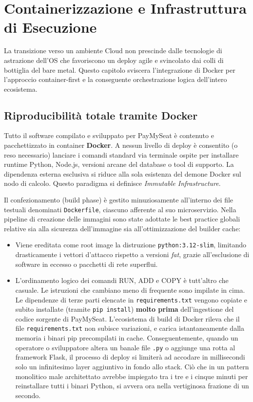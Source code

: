 \documentclass[11pt,a4paper]{report}
\begin{document}
\chapter{Containerizzazione e Infrastruttura di Esecuzione}

La transizione verso un ambiente Cloud non prescinde dalle tecnologie di astrazione dell'OS che favoriscono un deploy agile e svincolato dai colli di bottiglia del bare metal. Questo capitolo sviscera l'integrazione di Docker per l'approccio container-first e la conseguente orchestrazione logica dell'intero ecosistema.

\section{Riproducibilità totale tramite Docker}
Tutto il software compilato e sviluppato per PayMySeat \`e contenuto e pacchettizzato in container \textbf{Docker}. A nessun livello di deploy \`e consentito (o reso necessario) lanciare i comandi standard via terminale ospite per installare runtime Python, Node.js, versioni arcane del database o tool di supporto. La dipendenza esterna esclusiva si riduce alla sola esistenza del demone Docker sul nodo di calcolo. Questo paradigma si definisce \textit{Immutable Infrastructure}.

Il confezionamento (build phase) \`e gestito minuziosamente all'interno dei file testuali denominati \texttt{Dockerfile}, ciascuno afferente al suo microservizio.
Nella pipeline di creazione delle immagini sono state adottate le best practice globali relative sia alla sicurezza dell'immagine sia all'ottimizzazione del builder cache:
\begin{itemize}
    \item Viene ereditata come root image la distruzione \texttt{python:3.12-slim}, limitando drasticamente i vettori d'attacco rispetto a versioni \textit{fat}, grazie all'esclusione di software in eccesso o pacchetti di rete superflui.
    \item L'ordinamento logico dei comandi RUN, ADD e COPY \`e tutt'altro che casuale. Le istruzioni che cambiano meno di frequente sono impilate in cima. Le dipendenze di terze parti elencate in \texttt{requirements.txt} vengono copiate e subito installate (tramite \texttt{pip install}) \textbf{molto prima} dell'ingestione del codice sorgente di PayMySeat. 
    L'ecosistema di build di Docker rileva che il file \texttt{requirements.txt} non subisce variazioni, e carica istantaneamente dalla memoria i binari pip precompilati in cache. Conseguentemente, quando un operatore o sviluppatore altera un banale file \texttt{.py} o aggiunge una rotta al framework Flask, il processo di deploy si limiter\`a ad accodare in millisecondi solo un infinitesimo layer aggiuntivo in fondo allo stack. Ci\`o che in un pattern monolitico male architettato avrebbe impiegato tra i tre e i cinque minuti per reinstallare tutti i binari Python, si avvera ora nella vertiginosa frazione di un secondo.
\end{itemize}
\end{document}
